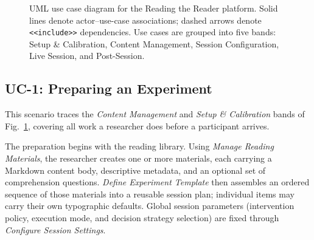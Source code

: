 \begin{figure}[p]
{%
}
\caption[UML use case diagram for the platform.]{%
UML use case diagram for the Reading the Reader platform.
Solid lines denote actor--use-case associations;
dashed arrows denote \texttt{<<include>>} dependencies.
Use cases are grouped into five bands:
Setup \& Calibration, Content Management, Session Configuration,
Live Session, and Post-Session.%
}
\label{fig:use-case-diagram}
\end{figure}

\subsection{UC-1: Preparing an Experiment}
\label{sec:uc1}

This scenario traces the \textit{Content Management} and \textit{Setup \&
Calibration} bands of Fig.~\ref{fig:use-case-diagram}, covering all work a
researcher does before a participant arrives.

The preparation begins with the reading library.
Using \textit{Manage Reading Materials}, the researcher creates one or more
materials, each carrying a Markdown content body, descriptive metadata, and an
optional set of comprehension questions.
\textit{Define Experiment Template} then assembles an ordered sequence of those
materials into a reusable session plan; individual items may carry their own
typographic defaults.
Global session parameters (intervention policy, execution mode, and decision
strategy selection) are fixed through \textit{Configure Session Settings}.

